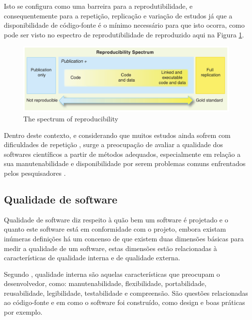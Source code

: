 \documentclass[qual, classic, a4paper]{ufbathesis}
\begin{document}
Isto se configura como uma barreira para a reprodutibilidade, e
consequentemente para a repetição, replicação e variação de estudos
\cite{Feitelson2015} já que a disponibilidade de código-fonte é o mínimo
necessário para que isto ocorra, como pode ser visto no espectro de
reprodutibilidade de  reproduzido aqui na Figura
\ref{reproducibility-spectrum}.

\begin{figure}[h]
  \center
  \includegraphics[scale=0.25]{imagens/reproducibility-spectrum.png}
  \caption{The spectrum of reproducibility\cite{Peng2011}}
  \label{reproducibility-spectrum}
\end{figure}

Dentro deste contexto, e considerando que muitos estudos ainda sofrem com
dificuldades de repetição \cite{Tang2016}, surge a preocupação de avaliar a
qualidade dos softwares científicos a partir de métodos adequados,
especialmente em relação a sua manutenabilidade e disponibilidade por serem
problemas comuns enfrentados pelos pesquisadores \cite{Prlic2012}.

\subsection{Qualidade de software}

Qualidade de software diz respeito à quão bem um software é projetado e o
quanto este software está em conformidade com o projeto, embora existam
inúmeras definições há um concenso de que existem duas dimensões básicas para medir a
qualidade de um software, estas dimensões estão relacionadas à características
de qualidade interna e de qualidade externa.

Segundo , qualidade interna são aquelas
características que preocupam o desenvolvedor, como: manutenabilidade,
flexibilidade, portabilidade, reusabilidade, legibilidade, testabilidade e
compreensão. São questões relacionadas ao código-fonte e em como o software
foi construído, como design e boas práticas por exemplo.
\end{document}

